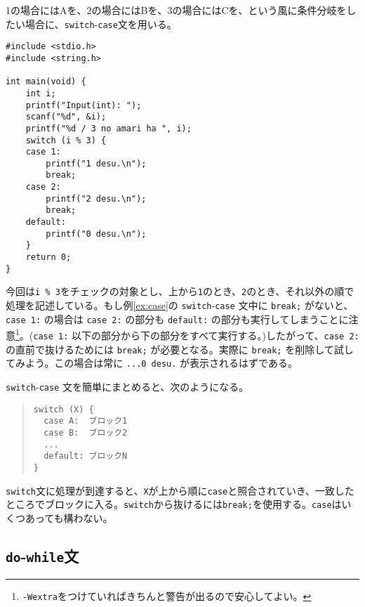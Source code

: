 1の場合にはAを、2の場合にはBを、3の場合にはCを、という風に条件分岐をしたい場合に、\texttt{switch}-\texttt{case}文を用いる。
\begin{reidai}\label{ex:case}
    \begin{verbatim}
#include <stdio.h>
#include <string.h>

int main(void) {
    int i;
    printf("Input(int): ");
    scanf("%d", &i);
    printf("%d / 3 no amari ha ", i);
    switch (i % 3) {
    case 1:
        printf("1 desu.\n");
        break;
    case 2:
        printf("2 desu.\n");
        break;
    default:
        printf("0 desu.\n");
    }
    return 0;
}
\end{verbatim}
\end{reidai} \noindent
今回は\texttt{i \% 3}をチェックの対象とし、上から\texttt{1}のとき、\texttt{2}のとき、それ以外の順で処理を記述している。もし例\ref{ex:case}の \texttt{switch}-\texttt{case} 文中に \texttt{break;} がないと、\texttt{case 1:} の場合は \texttt{case 2:} の部分も \texttt{default:} の部分も実行してしまうことに注意\footnote{\texttt{-Wextra}をつけていればきちんと警告が出るので安心してよい。}。(\texttt{case 1:} 以下の部分から下の部分をすべて実行する。)したがって、\texttt{case 2:} の直前で抜けるためには \texttt{break;} が必要となる。実際に \texttt{break;} を削除して試してみよう。この場合は常に \texttt{...0 desu.} が表示されるはずである。

\texttt{switch}-\texttt{case} 文を簡単にまとめると、次のようになる。
\begin{quote}
    \begin{verbatim}
switch (X) {
  case A:  ブロック1
  case B:  ブロック2
  ...
  default: ブロックN
}
\end{verbatim}
\end{quote}
\texttt{switch}文に処理が到達すると、\texttt{X}が上から順に\texttt{case}と照合されていき、一致したところでブロックに入る。\texttt{switch}から抜けるには\texttt{break;}を使用する。\texttt{case}はいくつあっても構わない。

\subsection{\texttt{do}-\texttt{while}文}

